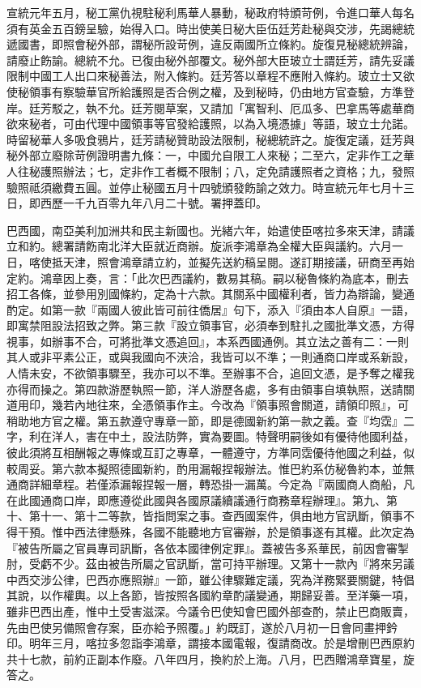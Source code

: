 \begin{pinyinscope}
宣統元年五月，秘工黨仇視駐秘利馬華人暴動，秘政府特頒苛例，令進口華人每名須有英金五百鎊呈驗，始得入口。時出使美日秘大臣伍廷芳赴秘與交涉，先謁總統遞國書，即照會秘外部，謂秘所設苛例，違反兩國所立條約。旋復見秘總統辨論，請廢止飭諭。總統不允。已復由秘外部覆文。秘外部大臣玻立士謂廷芳，請先妥議限制中國工人出口來秘善法，附入條約。廷芳答以章程不應附入條約。玻立士又欲使秘領事有察驗華官所給護照是否合例之權，及到秘時，仍由地方官查驗，方準登岸。廷芳駁之，執不允。廷芳閱草案，又請加「寓智利、厄瓜多、巴拿馬等處華商欲來秘者，可由代理中國領事等官發給護照，以為入境憑據」等語，玻立士允諾。時留秘華人多吸食鴉片，廷芳請秘贊助設法限制，秘總統許之。旋復定議，廷芳與秘外部立廢除苛例證明書九條：一，中國允自限工人來秘；二至六，定非作工之華人往秘護照辦法；七，定非作工者概不限制；八，定免請護照者之資格；九，發照驗照祗須繳費五圓。並停止秘國五月十四號頒發飭諭之效力。時宣統元年七月十三日，即西歷一千九百零九年八月二十號。署押蓋印。

巴西國，南亞美利加洲共和民主新國也。光緒六年，始遣使臣喀拉多來天津，請議立和約。總署請飭南北洋大臣就近商辦。旋派李鴻章為全權大臣與議約。六月一日，喀使抵天津，照會鴻章請立約，並擬先送約稿呈閱。遂訂期接議，研商至再始定約。鴻章因上奏，言：「此次巴西議約，數易其稿。嗣以秘魯條約為底本，刪去招工各條，並參用別國條約，定為十六款。其關系中國權利者，皆力為辯論，變通酌定。如第一款『兩國人彼此皆可前往僑居』句下，添入『須由本人自原』一語，即寓禁阻設法招致之弊。第三款『設立領事官，必須奉到駐扎之國批準文憑，方得視事，如辦事不合，可將批準文憑追回』，本系西國通例。其立法之善有二：一則其人或非平素公正，或與我國向不浹洽，我皆可以不準；一則通商口岸或系新設，人情未安，不欲領事驟至，我亦可以不準。至辦事不合，追回文憑，是予奪之權我亦得而操之。第四款游歷執照一節，洋人游歷各處，多有由領事自填執照，送請關道用印，幾若內地往來，全憑領事作主。今改為『領事照會關道，請領印照』，可稍助地方官之權。第五款遵守專章一節，即是德國新約第一款之義。查『均霑』二字，利在洋人，害在中土，設法防弊，實為要圖。特聲明嗣後如有優待他國利益，彼此須將互相酬報之專條或互訂之專章，一體遵守，方準同霑優待他國之利益，似較周妥。第六款本擬照德國新約，酌用漏報捏報辦法。惟巴約系仿秘魯約本，並無通商詳細章程。若僅添漏報捏報一層，轉恐掛一漏萬。今定為『兩國商人商船，凡在此國通商口岸，即應遵從此國與各國原議續議通行商務章程辦理』。第九、第十、第十一、第十二等款，皆指問案之事。查西國案件，俱由地方官訊斷，領事不得干預。惟中西法律懸殊，各國不能聽地方官審辦，於是領事遂有其權。此次定為『被告所屬之官員專司訊斷，各依本國律例定罪』。蓋被告多系華民，前因會審掣肘，受虧不少。茲由被告所屬之官訊斷，當可持平辦理。又第十一款內『將來另議中西交涉公律，巴西亦應照辦』一節，雖公律驟難定議，究為洋務緊要關鍵，特倡其說，以作權輿。以上各節，皆按照各國約章酌議變通，期歸妥善。至洋藥一項，雖非巴西出產，惟中土受害滋深。今議令巴使知會巴國外部查酌，禁止巴商販賣，先由巴使另備照會存案，臣亦給予照覆。」約既訂，遂於八月初一日會同畫押鈐印。明年三月，喀拉多忽詣李鴻章，謂接本國電報，復請商改。於是增刪巴西原約共十七款，前約正副本作廢。八年四月，換約於上海。八月，巴西贈鴻章寶星，旋答之。


\end{pinyinscope}
